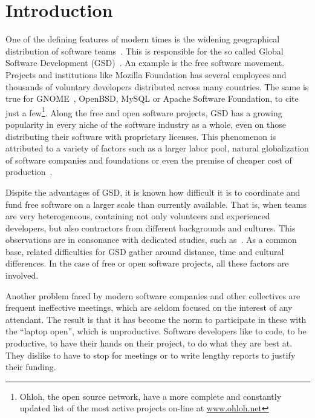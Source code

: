 \documentclass[letterpaper]{article}
\newcommand{\indraftnote}[1]{\textcolor{blue}{\texttt{\footnotesize[#1]}}}
\newcommand{\todo}[1]{\indraftnote{todo: #1}}
\begin{document}


\section{Introduction}

One of the defining features of modern times is the widening
geographical distribution of software teams~\cite{last2003}.
This is responsible for the so called Global Software Development (GSD)~\cite{german2003}. 
An example is the free software
movement. Projects and institutions like Mozilla Foundation has several
employees and thousands of voluntary developers distributed across
many countries. The same is true for GNOME~\cite{german2003}, OpenBSD,
MySQL or Apache Software Foundation, to cite just a few\footnote{Ohloh, the open source network, have a more complete
  and constantly updated list of the most active projects on-line at
  \url{www.ohloh.net}}. Along the free and open software
projects, GSD has a growing popularity in every niche of the software
industry as a whole, even on those distributing their software with
proprietary licenses. This phenomenon is attributed to a variety of factors
such as a larger labor pool, natural globalization of software companies
and foundations or even the premise of cheaper cost of
production~\cite{komi2005}.

Dispite the advantages of GSD, it is known how
difficult it is to coordinate and fund free software on a larger scale
than currently available. That is, when teams are very heterogeneous, containing
not only volunteers and experienced developers, but also
contractors from different backgrounds and cultures. This observations
are in consonance with dedicated studies, such as~\cite{carmel1999}.
As a common base, related difficulties for GSD gather around distance, time and cultural differences. In
the case of free or open software projects, all these factors are
involved.

Another problem faced by modern software companies and other
collectives are frequent ineffective meetings, which are seldom
focused on the interest of any attendant. The result is that it has
become the norm to participate in these with the ``laptop
open'', which is unproductive. Software developers
like to code, to be productive, to have their hands on their project,
to do what they are best at. They dislike to have to stop for meetings
or to write lengthy reports to justify their funding.
\end{document}
